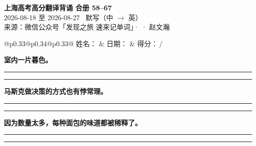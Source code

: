 \documentclass[11pt,a4paper]{article}
\newcommand{\num}[1]{\makebox[1.9em][r]{#1.}\hspace{0.3em}}
\newcommand{\wline}{\noindent\rule{\linewidth}{0.4pt}}
\begin{document}
\pagestyle{plain}
\begin{center}
{\LARGE\bfseries 上海高考高分翻译背诵 \quad 合册 58–67}\\[0.25em]
{\large 2026-08-18 至 2026-08-27 \quad\ 默写（中 $\to$ 英）}\\[0.35em]
{\footnotesize 来源：微信公众号「发现之旅 速来记单词」·  · 赵文瀚}
\end{center}

\vspace{0.4em}
\noindent\begin{tabular}{@{}p{0.33\textwidth}@{}p{0.34\textwidth}@{}p{0.33\textwidth}@{}}
姓名：\underline{\hspace{2.0cm}} & 日期：\underline{\hspace{2.0cm}} & 得分：\underline{\hspace{1.4cm}}\,/ \\
\end{tabular}

\vspace{0.5em}

\vspace{0.8em}
\vspace{0.35em}\vspace{0.15em}

\begin{minipage}{\linewidth}

\num{1}\textbf{室内一片暮色。}

\vspace{0.3em}

\wline\vspace{0.3em}
\wline

\end{minipage}

\begin{minipage}{\linewidth}

\num{2}\textbf{马斯克做决策的方式也有悖常理。}

\vspace{0.3em}

\wline\vspace{0.3em}
\wline

\end{minipage}

\begin{minipage}{\linewidth}

\num{3}\textbf{因为数量太多，每种面包的味道都被稀释了。}

\vspace{0.3em}

\wline\vspace{0.3em}
\wline

\end{minipage}
\end{document}
